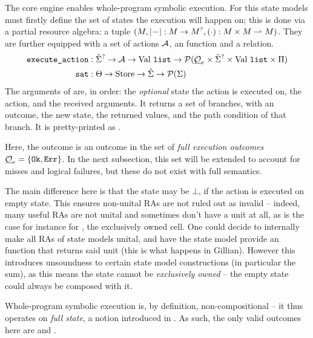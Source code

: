 \newcommand{\vallist}[0]{\Val~\code{list}}

The core engine enables whole-program symbolic execution. For this state models must firstly define the set of states the execution will happen on; this is done via a partial resource algebra: a tuple  $(M, |\!-\!|:M\rightarrow M^?,(\cdot):M\times M\rightharpoonup M)$. They are further equipped with a set of actions $\cal A$, an \execac{} function and a  relation.
\begin{align*}
	\execac &: \Sst^? \rarr {\cal A} \rarr \vallist \rarr \pset(\full\outcomes_e \times \Sst^? \times \vallist \times \Pc) \\
	\code{sat} &: \Theta \rarr \text{Store} \rarr \Sst \rarr \pset(\St)
\end{align*}
The arguments of \execac{} are, in order: the \emph{optional} state the action is executed on, the action, and the received arguments. It returns a set of branches, with an outcome, the new state, the returned values, and the path condition of that branch. It is pretty-printed as .

Here, the outcome is an outcome in the set of \emph{full execution outcomes} $\underline{{\cal O}}_e=\{ \texttt{Ok},\texttt{Err} \}$. In the next subsection, this set will be extended to account for misses and logical failures, but these do not exist with full semantics.

The main difference here is that the state may be $\bot$, if the action is executed on empty state. This ensures non-unital RAs are not ruled out as invalid -- indeed, many useful RAs are not unital and sometimes don't have a unit at all, as is the case for instance for \Ex, the exclusively owned cell. One could decide to internally make all RAs of state models unital, and have the state model provide an  function that returns said unit (this is what happens in Gillian). However this introduces unsoundness to certain state model constructions (in particular the sum), as this means the state cannot be \emph{exclusively owned} -- the empty state could always be composed with it.

Whole-program symbolic execution is, by definition, non-compositional -- it thus operates on \emph{full state}, a notion introduced in \cite{sacha-phd}. As such, the only valid outcomes here are \Ok{} and \Err{}.

